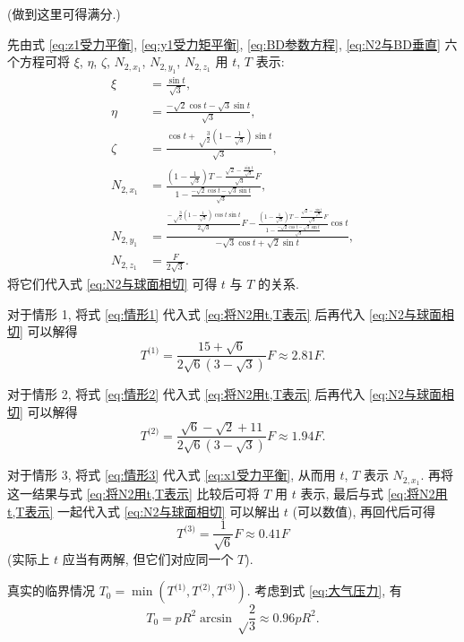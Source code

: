 \documentclass{article}
\begin{document}
(做到这里可得满分.)

先由式 \ref{eq:z1受力平衡}, \ref{eq:y1受力矩平衡}, \ref{eq:BD参数方程}, \ref{eq:N2与BD垂直}
六个方程可将 $\xi$, $\eta$, $\zeta$, $N_{2,x_1}$, $N_{2,y_1}$, $N_{2,z_1}$ 用 $t$, $T$ 表示:
\begin{equation}
\begin{split}
	\xi&=\frac{\sin t}{\sqrt3},\\
	\eta&=\frac{-\sqrt2\cos t-\sqrt3\sin t}{\sqrt3},\\
	\zeta&=\frac{\cos t+\sqrt\frac32\left(1-\frac1{\sqrt3}\right)\sin t}{\sqrt3},\\
	N_{2,x_1}&=\frac{\left(1-\frac1{\sqrt3}\right)T-\frac{\sqrt2-\frac{\sin t}{\sqrt3}}{\sqrt3}F}{1-\frac{-\sqrt2\cos t-\sqrt3\sin t}{\sqrt3}},\\
	N_{2,y_1}&=\frac{\frac{-\sqrt\frac32\left(1-\frac1{\sqrt3}\right)\cos t\sin t}{2\sqrt3}F-\frac{\left(1-\frac1{\sqrt3}\right)T-\frac{\sqrt2-\frac{\sin t}{\sqrt3}}{\sqrt3}F}{1-\frac{-\sqrt2\cos t-\sqrt3\sin t}{\sqrt3}}\cos t}{-\sqrt3\cos t+\sqrt2\sin t},\\
	N_{2,z_1}&=\frac F{2\sqrt3}.
\end{split}
	\label{eq:将N2用t,T表示}
\end{equation}
将它们代入式 \ref{eq:N2与球面相切} 可得 $t$ 与 $T$ 的关系.

对于情形 1, 将式 \ref{eq:情形1} 代入式 \ref{eq:将N2用t,T表示} 后再代入 \ref{eq:N2与球面相切} 可以解得
\begin{equation}
	T^{\text{(1)}}=\frac{15+\sqrt6}{2\sqrt6\left(3-\sqrt3\right)}F\approx2.81F.
\end{equation}

对于情形 2, 将式 \ref{eq:情形2} 代入式 \ref{eq:将N2用t,T表示} 后再代入 \ref{eq:N2与球面相切} 可以解得
\begin{equation}
	T^{\text{(2)}}=\frac{\sqrt6-\sqrt2+11}{2\sqrt6\left(3-\sqrt3\right)}F\approx1.94F.
\end{equation}

对于情形 3, 将式 \ref{eq:情形3} 代入式 \ref{eq:x1受力平衡}, 从而用 $t$, $T$ 表示 $N_{2,x_1}$.
再将这一结果与式 \ref{eq:将N2用t,T表示} 比较后可将 $T$ 用 $t$ 表示,
最后与式 \ref{eq:将N2用t,T表示} 一起代入式 \ref{eq:N2与球面相切} 可以解出 $t$ (可以数值),
再回代后可得
\begin{equation}
	T^{\text{(3)}}=\frac1{\sqrt6}F\approx0.41F
\end{equation}
(实际上 $t$ 应当有两解, 但它们对应同一个 $T$).

真实的临界情况 $T_0=\min\!\left(T^{\text{(1)}},T^{\text{(2)}},T^{\text{(3)}}\right)$.
考虑到式 \ref{eq:大气压力}, 有
\begin{equation}
	T_0=pR^2\arcsin\sqrt\frac23\approx0.96pR^2.
\end{equation}
\end{document}
